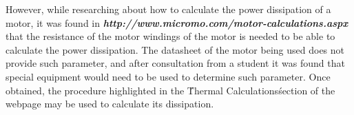 		However, while researching about how to calculate the power dissipation of a motor, it was found in \textbf{\emph{http://www.micromo.com/motor-calculations.aspx}} that the resistance of the motor windings of the motor is needed to be able to calculate the power dissipation. The datasheet of the motor being used does not provide such parameter, and after consultation from a student it was found that special equipment would need to be used to determine such parameter. Once obtained, the procedure highlighted in the \'Thermal Calculations\'   section of the webpage may be used to calculate its dissipation.
